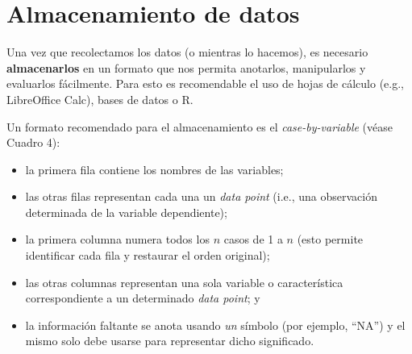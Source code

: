 \documentclass[authoryear,a4paper, 14pt]{scrartcl}
\begin{document}
\hypertarget{almacenamiento-de-datos}{%
\section{Almacenamiento de datos}\label{almacenamiento-de-datos}}

Una vez que recolectamos los datos (o mientras lo hacemos), es necesario
\textbf{almacenarlos} en un formato que nos permita anotarlos,
manipularlos y evaluarlos fácilmente. Para esto es recomendable el uso
de hojas de cálculo (e.g., LibreOffice Calc), bases de datos o R.

Un formato recomendado para el almacenamiento es el
\emph{case-by-variable} (véase Cuadro 4):

\begin{itemize}
    \item
      la primera fila contiene los nombres de las variables;
    \item
      las otras filas representan cada una un \emph{data point} (i.e., una
      observación determinada de la variable dependiente);
    \item
      la primera columna numera todos los \(n\) casos de 1 a \(n\) (esto
      permite identificar cada fila y restaurar el orden original);
    \item
      las otras columnas representan una sola variable o característica
      correspondiente a un determinado \emph{data point}; y
    \item
      la información faltante se anota usando \emph{un} símbolo (por
      ejemplo, ``NA'') y el mismo solo debe usarse para representar dicho
      significado.
\end{itemize}
\end{document}
